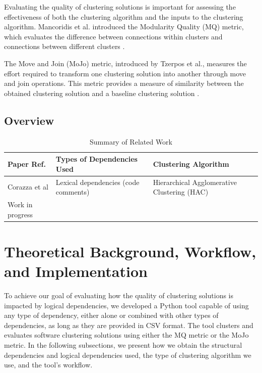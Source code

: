 \documentclass{ieeeaccess}
\begin{document}
Evaluating the quality of clustering solutions is important for assessing the effectiveness of both the clustering algorithm and the inputs to the clustering algorithm. Mancoridis et al. introduced the Modularity Quality (MQ) metric, which evaluates the difference between connections within clusters and connections between different clusters \cite{b10}.

The Move and Join (MoJo) metric, introduced by Tzerpos et al., measures the effort required to transform one clustering solution into another through move and join operations. This metric provides a measure of similarity between the obtained clustering solution and a baseline clustering solution \cite{b11}.

\subsection{Overview}

\begin{table}[h]
\caption{Summary of Related Work}
\label{tab:related_work}
\centering
\setlength{\tabcolsep}{3pt}
\begin{tabular}{|l|p{3cm}|p{3cm}|}
\hline
\textbf{Paper Ref.} & \textbf{Types of Dependencies Used} & \textbf{Clustering Algorithm} \\
\hline
Corazza et al \cite {b13} & Lexical dependencies (code comments) & Hierarchical
Agglomerative Clustering (HAC)  \\
\hline
Work in progress &&\\
\hline
\end{tabular}
\end{table}




\section{Theoretical Background, Workflow, and Implementation}
\label{sec:workflow_implementation}

To achieve our goal of evaluating how the quality of clustering solutions is impacted by logical dependencies, we developed a Python tool capable of using any type of dependency, either alone or combined with other types of dependencies, as long as they are provided in CSV format. The tool clusters and evaluates software clustering solutions using either the MQ metric or the MoJo metric. In the following subsections, we present how we obtain the structural dependencies and logical dependencies used, the type of clustering algorithm we use, and the tool's workflow.
\end{document}

